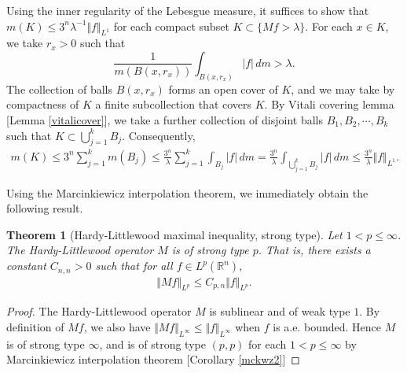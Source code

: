 \documentclass{article}
\numberwithin{equation}{section}
\newcommand{\bbR}{\mathbb{R}}
\theoremstyle{plain}
\newtheorem{theorem}{Theorem}[section]
\theoremstyle{definition}
\begin{document}
Using the inner regularity of the Lebesgue measure, it suffices to show that $m(K)\leq 3^n\lambda^{-1}\Vert f\Vert_{L^1}$ for each compact subset $K\subset\{Mf>\lambda\}$. For each $x\in K$, we take $r_x>0$ such that $$\frac{1}{m(B(x,r_x))}\int_{B(x,r_x)}\vert f\vert\,dm>\lambda.$$
The collection of balls $B(x,r_x)$ forms an open cover of $K$, and we may take by compactness of $K$ a finite subcollection that covers $K$. By Vitali covering lemma [Lemma \ref{vitalicover}], we take a further collection of disjoint balls $B_1,B_2,\cdots,B_k$ such that $K\subset\bigcup_{j=1}^k B_j$. Consequently,
\begin{align*}
	m(K)\leq 3^n\sum_{j=1}^k m(B_j)\leq\frac{3^n}{\lambda}\sum_{j=1}^k\int_{B_j}\vert f\vert\,dm=\frac{3^n}{\lambda}\int_{\bigcup_{j=1}^k B_j}\vert f\vert\,dm\leq\frac{3^n}{\lambda}\Vert f\Vert_{L^1}.\tag*{\qed}
\end{align*}

Using the Marcinkiewicz interpolation theorem, we immediately obtain the following result.
\begin{theorem}[Hardy-Littlewood maximal inequality, strong type]
Let $1<p\leq\infty$. The Hardy-Littlewood operator $M$ is of strong type $p$. That is, there exists a constant $C_{n,n}>0$ such that for all $f\in L^p(\bbR^n)$,
\begin{align*}
	\Vert Mf\Vert_{L^p}\leq C_{p,n}\Vert f\Vert_{L^p}.
\end{align*}
\end{theorem}
\begin{proof}
The Hardy-Littlewood operator $M$ is sublinear and of weak type $1$. By definition of $Mf$, we also have $\Vert Mf\Vert_{L^\infty}\leq\Vert f\Vert_{L^\infty}$ when $f$ is a.e. bounded. Hence $M$ is of strong type $\infty$, and is of strong type $(p,p)$ for each $1<p\leq\infty$ by Marcinkiewicz interpolation theorem [Corollary \ref{mckwz2}] 
\end{proof}

\newpage
\end{document}
